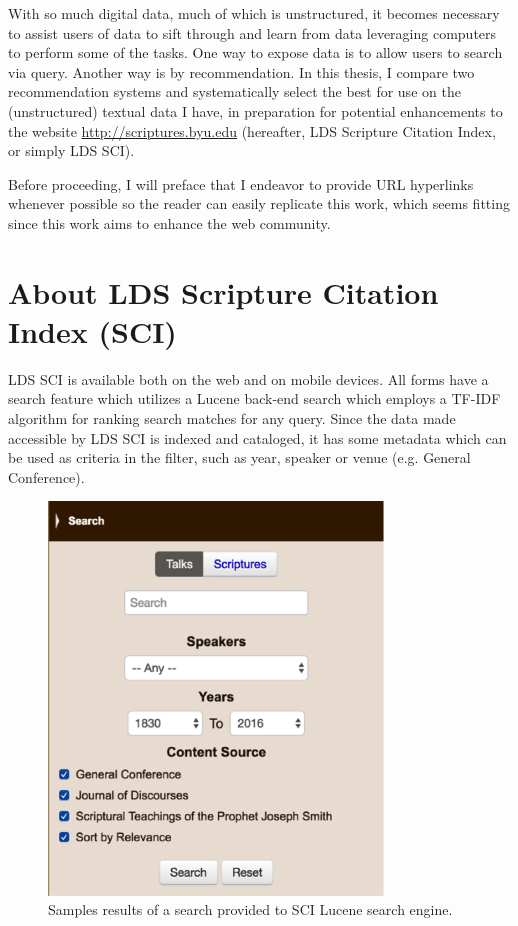 With so much digital data, much of which is unstructured, it becomes necessary to assist users of data to sift through and learn from data leveraging computers to perform some of the tasks. One way to expose data is to allow users to search via query. Another way is by recommendation. In this thesis, I compare two recommendation systems and systematically select the best for use on the (unstructured) textual data I have, in preparation for potential enhancements to the website \url{http://scriptures.byu.edu} (hereafter, LDS Scripture Citation Index, or simply LDS SCI).




Before proceeding, I will preface that I endeavor to provide URL hyperlinks whenever possible so the reader can easily replicate this work, which seems fitting since this work aims to enhance the web community.

\section{About LDS Scripture Citation Index (SCI)}
LDS SCI is available both on the web and on mobile devices. All forms have a search feature which utilizes a Lucene \citep{lucene:luke} back-end search which employs a TF-IDF algorithm for ranking search matches for any query. Since the data made accessible by LDS SCI is indexed and cataloged, it has some metadata which can be used as criteria in the filter, such as year, speaker or venue (e.g. General Conference).

\begin{figure}[hhhhhtb]
	\centering
		\includegraphics[width=3.5in,natwidth=310,natheight=442]{figures/sci_search.png}
		\caption[SCI TF-IDF Search Results]{
			Samples results of a search provided to SCI Lucene search engine.
		}
	\label{fig:sci_search}
\end{figure}

